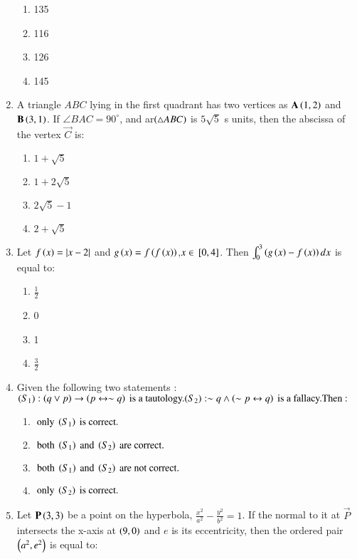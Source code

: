 \documentclass[journal]{IEEEtran}
\begin{document}
\begin{enumerate}
\begin{enumerate}
    \item 135
    \item 116
    \item 126
    \item 145
\end{enumerate}
\item A triangle $ABC$ lying in the first quadrant has two vertices as $ \mathbf{A}\left(1,2\right)$ and $\mathbf{B}\left(3,1\right)$. If $\angle BAC=90^\circ$, and ar$\left(\triangle ABC\right)$ is $5\sqrt{5}$ s units, then the abscissa of the vertex $\vec{C}$ is:
\begin{enumerate}
    \item $1+\sqrt{5}$
    \item $1+2\sqrt{5}$
    \item $2\sqrt{5}-1$
    \item $2+\sqrt{5}$
\end{enumerate}
\item Let $f\left(x\right)=\left\vert x-2\right\vert$ and $g\left(x\right)=f\left(f\left(x\right)\right)$,$x\in {}\left[0, 4\right]$. Then $\int_0^3 \left(g\left(x\right)-f\left(x\right)\right) dx$ is equal to:
\begin{enumerate}
    \item $\frac{1}{2}$
    \item 0
    \item 1
    \item $\frac{3}{2}$
\end{enumerate}
\item Given the following two statements : \\
$(S_{1}) : \left(q \vee p\right) \rightarrow \left(p \leftrightarrow \sim q\right) \text{ is a tautology.} \\
(S_{2}) : \sim q \wedge \left(\sim p \leftrightarrow q\right) \text{ is a fallacy.} \\
\text{Then :}$ \\
\begin{enumerate}
\item $\text{ only } \left(S_{1}\right) \text{ is correct.}$
\item $\text{ both } \left(S_{1}\right) \text{ and } \left(S_{2}\right) \text{ are correct.}$
\item $\text{ both } \left(S_{1}\right) \text{ and } \left(S_{2}\right) \text{ are not correct.}$
\item $\text{ only } \left(S_{2}\right) \text{ is correct.}$
\end{enumerate}
\item Let $\mathbf{P}\left(3,3\right)$ be a point on the hyperbola, $\frac{x^2}{a^2}-\frac{y^2}{b^2}=1$. If the normal to it at $\vec{P}$ intersects the x-axis at $\left(9,0\right)$ and $e$ is its eccentricity, then the ordered pair $\left(a^2, e^2\right)$ is equal to:

\end{enumerate}
\end{document}
